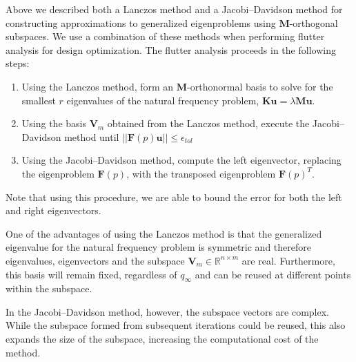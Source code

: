 \documentclass[12pt]{article}
\newcommand{\mb}{\mathbf}
\begin{document}
Above we described both a Lanczos method and a Jacobi--Davidson method
for constructing approximations to generalized eigenproblems using
$\mb{M}$-orthogonal subspaces. We use a combination of these methods
when performing flutter analysis for design optimization.  The flutter
analysis proceeds in the following steps:
%
\begin{enumerate}
\item Using the Lanczos method, form an $\mb{M}$-orthonormal basis to
  solve for the smallest $r$ eigenvalues of the natural frequency
  problem, $\mb{K} \mb{u} = \lambda \mb{M} \mb{u}$.

\item Using the basis $\mb{V}_{m}$ obtained from the Lanczos method,
  execute the Jacobi--Davidson method until $||\mb{F}(p)\mb{u}|| \le
  \epsilon_{tol}$

\item Using the Jacobi--Davidson method, compute the left eigenvector,
  replacing the eigenproblem $\mb{F}(p)$, with the transposed
  eigenproblem $\mb{F}(p)^{T}$.
\end{enumerate}

Note that using this procedure, we are able to bound the error for
both the left and right eigenvectors.

One of the advantages of using the Lanczos method is that the
generalized eigenvalue for the natural frequency problem is symmetric
and therefore eigenvalues, eigenvectors and the subspace $\mb{V}_{m}
\in \mathbb{R}^{n \times m}$ are real. Furthermore, this basis will
remain fixed, regardless of $q_{\infty}$ and can be reused at
different points within the subspace.

In the Jacobi--Davidson method, however, the subspace vectors are
complex. While the subspace formed from subsequent iterations could be
reused, this also expands the size of the subspace, increasing the
computational cost of the method.
\end{document}
